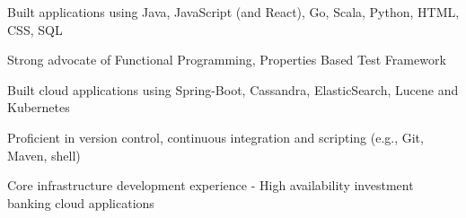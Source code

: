 \begin{cvitems}
\sectionspace
\sectionspace
\vspace{1mm}
	\fontsize{11pt}{1.4em}\bodyfontlight\upshape\color{text}
        \item {Built applications using Java, JavaScript (and React), Go, Scala, Python, HTML, CSS, SQL}
        \item {Strong advocate of Functional Programming, Properties Based Test Framework}
        \item {Built cloud applications using Spring-Boot, Cassandra, ElasticSearch, Lucene and Kubernetes}
        \item {Proficient in version control, continuous integration and scripting (e.g., Git, Maven, shell)}
        \item {Core infrastructure development experience - High availability investment banking cloud applications}
        \end{cvitems}
\vspace{1mm}
\sectionspace

